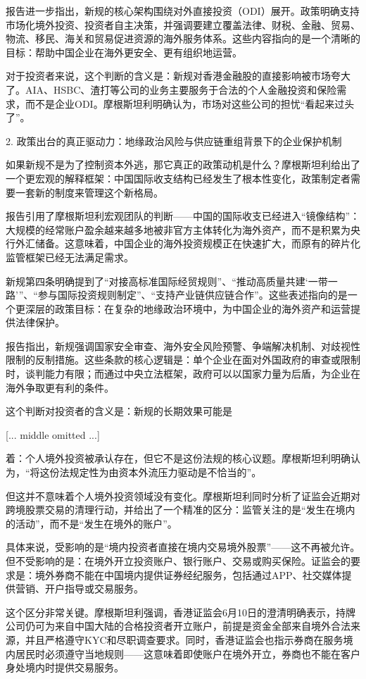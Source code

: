 \documentclass[11pt]{ctexart}
\begin{document}
报告进一步指出，新规的核心架构围绕对外直接投资（ODI）展开。政策明确支持市场化境外投资、投资者自主决策，并强调要建立覆盖法律、财税、金融、贸易、物流、移民、海关和贸易促进资源的海外服务体系。这些内容指向的是一个清晰的目标：帮助中国企业在海外更安全、更有组织地运营。

对于投资者来说，这个判断的含义是：新规对香港金融股的直接影响被市场夸大了。AIA、HSBC、渣打等公司的业务主要服务于合法的个人金融投资和保险需求，而不是企业ODI。摩根斯坦利明确认为，市场对这些公司的担忧“看起来过头了”。

2. 政策出台的真正驱动力：地缘政治风险与供应链重组背景下的企业保护机制

如果新规不是为了控制资本外逃，那它真正的政策动机是什么？摩根斯坦利给出了一个更宏观的解释框架：中国国际收支结构已经发生了根本性变化，政策制定者需要一套新的制度来管理这个新格局。

报告引用了摩根斯坦利宏观团队的判断——中国的国际收支已经进入“镜像结构”：大规模的经常账户盈余越来越多地被非官方主体转化为海外资产，而不是积累为央行外汇储备。这意味着，中国企业的海外投资规模正在快速扩大，而原有的碎片化监管框架已经无法满足需求。

新规第四条明确提到了“对接高标准国际经贸规则”、“推动高质量共建‘一带一路’”、“参与国际投资规则制定”、“支持产业链供应链合作”。这些表述指向的是一个更深层的政策目标：在复杂的地缘政治环境中，为中国企业的海外资产和运营提供法律保护。

报告指出，新规强调国家安全审查、海外安全风险预警、争端解决机制、对歧视性限制的反制措施。这些条款的核心逻辑是：单个企业在面对外国政府的审查或限制时，谈判能力有限；而通过中央立法框架，政府可以以国家力量为后盾，为企业在海外争取更有利的条件。

这个判断对投资者的含义是：新规的长期效果可能是

[... middle omitted ...]

着：个人境外投资被承认存在，但它不是这份法规的核心议题。摩根斯坦利明确认为，“将这份法规定性为由资本外流压力驱动是不恰当的”。

但这并不意味着个人境外投资领域没有变化。摩根斯坦利同时分析了证监会近期对跨境股票交易的清理行动，并给出了一个精准的区分：监管关注的是“发生在境内的活动”，而不是“发生在境外的账户”。

具体来说，受影响的是“境内投资者直接在境内交易境外股票”——这不再被允许。但不受影响的是：在境外开立投资账户、银行账户、交易或购买保险。证监会的要求是：境外券商不能在中国境内提供证券经纪服务，包括通过APP、社交媒体提供营销、开户指导或交易服务。

这个区分非常关键。摩根斯坦利强调，香港证监会6月10日的澄清明确表示，持牌公司仍可为来自中国大陆的合格投资者开立账户，前提是资金全部来自境外合法来源，并且严格遵守KYC和尽职调查要求。同时，香港证监会也指示券商在服务境内居民时必须遵守当地规则——这意味着即使账户在境外开立，券商也不能在客户身处境内时提供交易服务。
\end{document}
